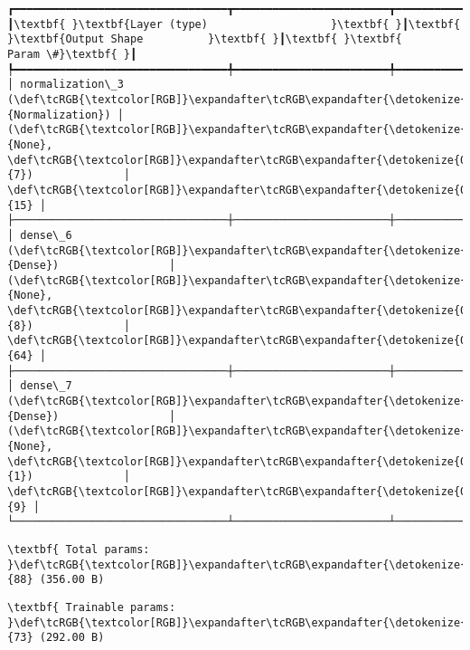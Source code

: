 \documentclass[11pt]{article}
\begin{document}
    \begin{Verbatim}[commandchars=\\\{\}]
┏━━━━━━━━━━━━━━━━━━━━━━━━━━━━━━━━━┳━━━━━━━━━━━━━━━━━━━━━━━━┳━━━━━━━━━━━━━━━┓
┃\textbf{ }\textbf{Layer (type)                   }\textbf{ }┃\textbf{ }\textbf{Output Shape          }\textbf{ }┃\textbf{ }\textbf{      Param \#}\textbf{ }┃
┡━━━━━━━━━━━━━━━━━━━━━━━━━━━━━━━━━╇━━━━━━━━━━━━━━━━━━━━━━━━╇━━━━━━━━━━━━━━━┩
│ normalization\_3 (\def\tcRGB{\textcolor[RGB]}\expandafter\tcRGB\expandafter{\detokenize{0,135,255}}{Normalization}) │ (\def\tcRGB{\textcolor[RGB]}\expandafter\tcRGB\expandafter{\detokenize{0,215,255}}{None}, \def\tcRGB{\textcolor[RGB]}\expandafter\tcRGB\expandafter{\detokenize{0,175,0}}{7})              │            \def\tcRGB{\textcolor[RGB]}\expandafter\tcRGB\expandafter{\detokenize{0,175,0}}{15} │
├─────────────────────────────────┼────────────────────────┼───────────────┤
│ dense\_6 (\def\tcRGB{\textcolor[RGB]}\expandafter\tcRGB\expandafter{\detokenize{0,135,255}}{Dense})                 │ (\def\tcRGB{\textcolor[RGB]}\expandafter\tcRGB\expandafter{\detokenize{0,215,255}}{None}, \def\tcRGB{\textcolor[RGB]}\expandafter\tcRGB\expandafter{\detokenize{0,175,0}}{8})              │            \def\tcRGB{\textcolor[RGB]}\expandafter\tcRGB\expandafter{\detokenize{0,175,0}}{64} │
├─────────────────────────────────┼────────────────────────┼───────────────┤
│ dense\_7 (\def\tcRGB{\textcolor[RGB]}\expandafter\tcRGB\expandafter{\detokenize{0,135,255}}{Dense})                 │ (\def\tcRGB{\textcolor[RGB]}\expandafter\tcRGB\expandafter{\detokenize{0,215,255}}{None}, \def\tcRGB{\textcolor[RGB]}\expandafter\tcRGB\expandafter{\detokenize{0,175,0}}{1})              │             \def\tcRGB{\textcolor[RGB]}\expandafter\tcRGB\expandafter{\detokenize{0,175,0}}{9} │
└─────────────────────────────────┴────────────────────────┴───────────────┘

    \end{Verbatim}

    
    
    \begin{Verbatim}[commandchars=\\\{\}]
\textbf{ Total params: }\def\tcRGB{\textcolor[RGB]}\expandafter\tcRGB\expandafter{\detokenize{0,175,0}}{88} (356.00 B)

    \end{Verbatim}

    
    
    \begin{Verbatim}[commandchars=\\\{\}]
\textbf{ Trainable params: }\def\tcRGB{\textcolor[RGB]}\expandafter\tcRGB\expandafter{\detokenize{0,175,0}}{73} (292.00 B)

    \end{Verbatim}
\end{document}
